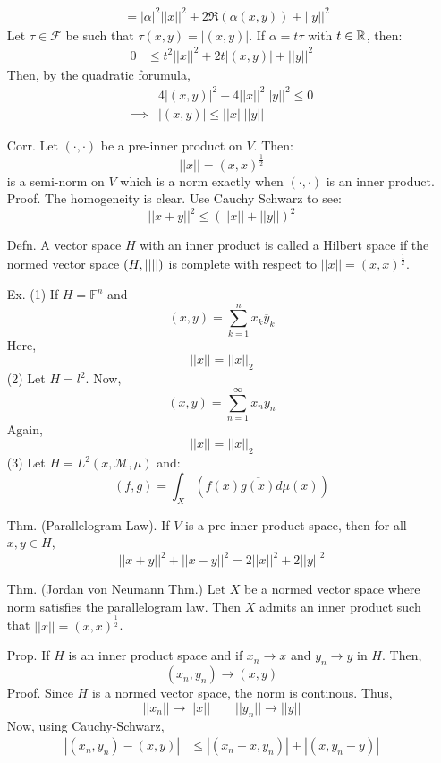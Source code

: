\documentclass[12pt]{article}
\begin{document}
\begin{itemize}
\begin{align*}
        &= |\alpha|^2 ||x||^2 + 2\Re(\alpha(x,y)) + ||y||^2
    \end{align*}
    Let $\tau \in \mathcal{F}$ be such that $\tau(x, y) = |(x, y)|$. If $\alpha = t\tau$ with $t \in \R$, then:
    \begin{align*}
        0 &\leq t^2 ||x||^2 + 2t|(x,y)| + ||y||^2  
    \end{align*}
    Then, by the quadratic forumula, 
    \begin{align*}
        &4|(x, y)|^2 - 4||x||^2||y||^2 \leq 0 \\
        \implies & |(x, y)| \leq ||x||||y||
    \end{align*}
    \item[Corr.] Let $(\cdot, \cdot)$ be a pre-inner product on $V$. Then: 
    \[ ||x|| = (x, x)^{\frac12}\]
    is a semi-norm on $V$ which is a norm exactly when $(\cdot, \cdot)$ is an inner product. \\
    Proof. The homogeneity is clear. Use Cauchy Schwarz to see: 
    \[ ||x+y||^2 \leq (||x|| + ||y||)^2\]
    \item[Defn.] A vector space $H$ with an inner product is called a Hilbert space if the normed vector space $(H, \left\vert\left\vert\right\vert\right\vert)$ is complete with respect to $||x|| = (x, x)^{\frac12}$. 
    \item[Ex.] (1) If $H = \mathbb F^n$ and
    \[ (x, y) = \sum_{k=1}^n x_k \overline{y}_k\]
    Here,
    \[ ||x|| = ||x||_2\]
    (2) Let $H = l^2$. Now, 
    \[ (x, y) = \sum_{n=1}^\infty x_n\overline{y_n}\]
    Again, 
    \[ ||x|| = ||x||_2\]
    (3) Let $H = L^2(x, \mathcal M, \mu)$ and:
    \[ (f, g) = \int_X ( f(x)\overline{g(x)} d\mu(x))\]
    \item[Thm.] (Parallelogram Law). If $V$ is a pre-inner product space, then for all $x, y \in H$, 
    \[ ||x+y||^2 + ||x-y||^2 = 2||x||^2 + 2||y||^2\]
    \item[Thm.] (Jordan von Neumann Thm.) Let $X$ be a normed vector space where norm satisfies the parallelogram law. Then $X$ admits an inner product such that $||x|| = (x, x)^{\frac12}$.
    \item[Prop.] If $H$ is an inner product space and if $x_n \to x$ and $y_n \to y$ in $H$. Then, 
    \[ (x_n, y_n) \to (x, y)\]
    Proof. Since $H$ is a normed vector space, the norm is continous. Thus, 
    \[||x_n|| \to ||x|| \qquad ||y_n|| \to ||y||\]
    Now, using Cauchy-Schwarz,
    \begin{align*}
        |(x_n, y_n) - (x, y)| &\leq |(x_n-x, y_n)| + |(x, y_n - y)| \\

\end{align*}
\end{itemize}
\end{document}
